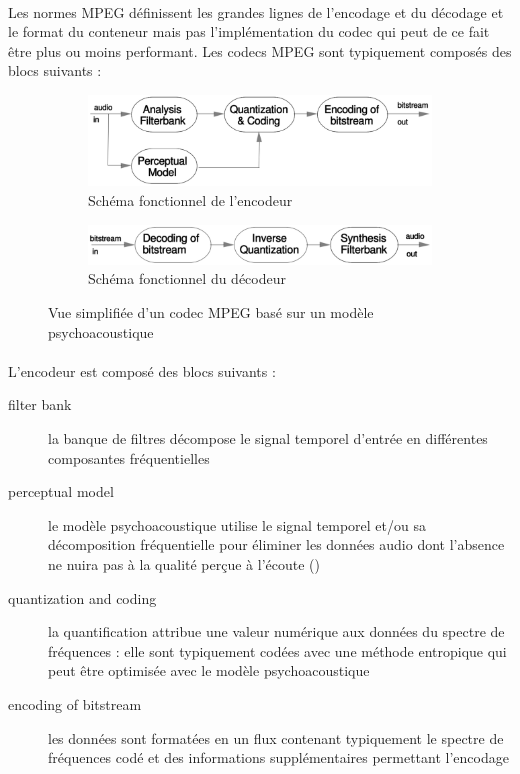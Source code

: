 \documentclass{article}
\begin{document}
    \paragraph{}
    Les normes MPEG définissent les grandes lignes de l'encodage et du décodage et le format du conteneur mais pas l'implémentation du codec qui peut de ce fait être plus ou moins performant. Les codecs MPEG sont typiquement composés des blocs suivants :
    \begin{figure}[H]
        \centering
        \begin{subfigure}[b]{.6\linewidth}
            \includegraphics[width=\linewidth]{./images/1999-Brandenburg-simple-AAC-encoder.png}
            \caption{Schéma fonctionnel de l'encodeur}
        \end{subfigure}
        \begin{subfigure}[b]{.6\linewidth}
            \includegraphics[width=\linewidth]{./images/1999-Brandenburg-simple-AAC-decoder.png}
            \caption{Schéma fonctionnel du décodeur}
        \end{subfigure}
        \caption{Vue simplifiée d'un codec MPEG basé sur un modèle psychoacoustique\cite{1999-Brandenburg}}
    \end{figure}
    \paragraph{}
    L'encodeur est composé des blocs suivants :
    \begin{description}
        \item[filter bank] la banque de filtres décompose le signal temporel d'entrée en différentes composantes fréquentielles
        \item[perceptual model] le modèle psychoacoustique utilise le signal temporel et/ou sa décomposition fréquentielle pour éliminer les données audio dont l'absence ne nuira pas à la qualité perçue à l'écoute ()
        \item[quantization and coding] la quantification attribue une valeur numérique aux données du spectre de fréquences : elle sont typiquement codées avec une méthode entropique qui peut être optimisée avec le modèle psychoacoustique
        \item[encoding of bitstream] les données sont formatées en un flux contenant typiquement le spectre de fréquences codé et des informations supplémentaires permettant l'encodage
    \end{description}
    
\end{document}
